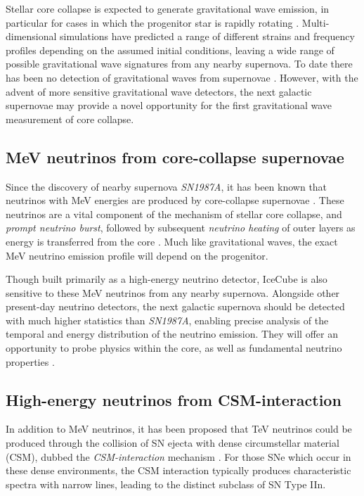Stellar core collapse is expected to generate gravitational wave emission, in particular for cases in which the  progenitor star is rapidly rotating . Multi-dimensional simulations have predicted a range of different strains and frequency profiles depending on the assumed initial conditions, leaving a wide range of possible gravitational wave signatures from any nearby supernova. To date there has been no detection of gravitational waves from supernovae . However, with the advent of more sensitive gravitational wave detectors, the next galactic supernovae may provide a novel opportunity for the first gravitational wave measurement of core collapse.

\subsection*{MeV neutrinos from core-collapse supernovae}

Since the discovery of nearby supernova \emph{SN1987A}, it has been known that neutrinos with MeV energies are produced by core-collapse supernovae . These neutrinos are a vital component of the mechanism of stellar core collapse, and \emph{prompt neutrino burst}, followed by subsequent \emph{neutrino heating} of outer layers as energy is transferred from the core . Much like gravitational waves, the exact MeV neutrino emission profile will depend on the progenitor.

Though built primarily as a high-energy neutrino detector, IceCube is also sensitive to these MeV neutrinos from any nearby supernova. Alongside other present-day neutrino detectors, the next galactic supernova should be detected with much higher statistics than \emph{SN1987A}, enabling precise analysis of the temporal and energy distribution of the neutrino emission. They will offer an opportunity to probe physics within the core, as well as fundamental neutrino properties \cite{sn_nu_review}.

\subsection*{High-energy neutrinos from CSM-interaction}

In addition to MeV neutrinos, it has been proposed that TeV neutrinos could be produced through the collision of SN ejecta with dense circumstellar material (CSM), dubbed the \emph{CSM-interaction} mechanism . For those SNe which occur in these dense environments, the CSM interaction typically produces characteristic spectra with narrow lines, leading to the distinct subclass of SN Type IIn. 

